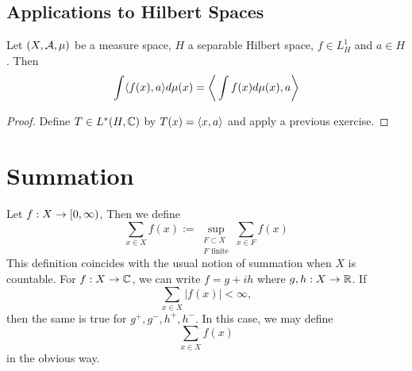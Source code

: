 \documentclass{book}
\begin{document}
	
	
	
	
	
	
	
	
	
	
	
	
	
	
	
	
	
	\newpage
	\section{Applications to Hilbert Spaces}	
	
	\begin{ex}  
	Let $(X, \mathcal{A}, \mu)$ be a measure space, $H$ a separable Hilbert space, $f \in L^1_H$ and $a \in H$. Then $$\int \langle f(x), a \rangle d\mu(x) = \bigg \langle \int f(x) d \mu(x) , a\bigg \rangle$$ 
	\end{ex}	
	
	\begin{proof}
	Define $T \in L^*(H, \mathbb{C})$ by $T(x) = \langle x, a \rangle$ and apply a previous exercise.
	\end{proof}
	
	
	
	
	
	
	
	
	
	
	
	
	
	
	
	
	
	
	
	
	
	
	
	
	
	
	
	

	
	

	
	\appendix
	
	\chapter{Summation}
	
	\begin{defn}  
		Let $f:X \rightarrow [0,\infty)$, Then we define $$\sum_{x \in X} f(x) := \sup_{\substack{F \subset X \\ F \text{ finite}}} \sum_{x \in F} f(x)$$ This definition coincides with the usual notion of summation when $X$ is countable. For $f:X \rightarrow \mathbb{C}$, we can write $f = g +ih$ where $g,h:X \rightarrow \mathbb{R}$. If $$\sum_{x \in X}|f(x)| < \infty,$$ then the same is true for $g^+,g^-,h^+,h^-$. In this case, we may define $$\sum_{x \in X} f(x)$$ in the obvious way.
	\end{defn} 
	
\end{document}
